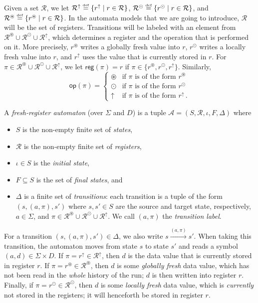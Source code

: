 \documentclass{LMCS}
\newcommand\df{\ensuremath{\mathrel{\smash{\stackrel{\scriptscriptstyle{
    \text{def}}}{=}}}}}
\newcommand{\Data}{D}
\def\A{\mathcal A}
\newcommand{\Reg}{\mathcal{R}}
\newcommand{\rReg}{\Reg^\uparrow}
\newcommand{\lReg}{\Reg^\odot}
\newcommand{\gReg}{\Reg^\circledast}
\newcommand{\extReg}{\gReg \mathrel{\cup} \lReg \mathrel{\cup} \rReg}
\newcommand{\rreg}[1]{#1^\uparrow}
\newcommand{\lfresh}[1]{#1^\odot}
\newcommand{\gfresh}[1]{#1^\circledast}
\newcommand{\regof}[1]{\textsf{reg}(#1)}
\newcommand{\opof}[1]{\textsf{op}(#1)}
\newcommand{\fStates}{F}
\newcommand{\States}{S}
\newcommand{\init}{\iota}
\newcommand{\Trans}{\Delta}
\newcommand{\xregtrans}[1]{\xrightarrow{#1}}
\newcommand{\param}{\pi}
\begin{document}
Given a set $\Reg$, we let $\rReg \df \{\rreg{r} \mid r \in \Reg\}$,
$\lReg \df \{\lfresh{r} \mid r \in \Reg\}$, and $\gReg \df
\{\gfresh{r} \mid r \in \Reg\}$.
In the automata models that we are going to introduce, $\Reg$ will be the set of registers.
Transitions will be labeled with an element
from $\extReg$, which determines a register and the operation that is
performed on it. More precisely, $\gfresh{r}$ writes a globally fresh value into $r$, $\lfresh{r}$
writes a locally fresh value into $r$, and $\rreg{r}$ uses the value that is currently stored in $r$. For $\param\in \extReg$, we let $\regof{\pi} = r$ if
$\pi \in \{\gfresh{r},\lfresh{r},\rreg{r}\}$. Similarly,
\[\opof{\pi}=\begin{cases}
\circledast & \text{if } \param \text{ is of the form } \gfresh{r}\\
\odot & \text{if } \param \text{ is of the form } \lfresh{r}\\
{\uparrow} & \text{if } \param \text{ is of the form } \rreg{r}\,.
\end{cases}\]

\begin{defi}
  A \emph{fresh-register automaton} (over $\Sigma$ and $\Data$) is a tuple $\A =
  (\States,\Reg,\init,\fStates,\Trans)$ where
  \begin{itemize}
  \item $\States$ is the non-empty finite set of \emph{states},
  \item $\Reg$ is the non-empty finite set of \emph{registers},
  \item $\init \in \States$ is the \emph{initial state},
  \item $\fStates \subseteq \States$ is the set of \emph{final
      states}, and
  \item $\Trans$ is a finite set of \emph{transitions}: each
    transition is a tuple of the form $(s,(a,\param),s')$ where $s,s'
    \in \States$ are the source and target state, respectively, $a \in
    \Sigma$, and $\param \in \extReg$. We call $(a,\param)$ the
    \emph{transition label}.
  \end{itemize}
\end{defi}

\noindent For a transition $(s,(a,\param),s') \in \Delta$, we also write $s
\xregtrans{(a,\param)} s'$. When taking this transition, the automaton
moves from state $s$ to state $s'$ and reads a symbol $(a,d) \in
\Sigma \times D$. If $\param = \rreg{r} \in \rReg$, then $d$ is the
data value that is currently stored in register $r$. If $\param =
\gfresh{r} \in \gReg$, then $d$ is some \emph{globally fresh} data
value, which has not been read in the \emph{whole} history of the run;
$d$ is then written into register $r$. Finally, if $\param =
\lfresh{r} \in \lReg$, then $d$ is some \emph{locally fresh} data
value, which is \emph{currently} not stored in the registers; it will
henceforth be stored in register $r$.
\end{document}
